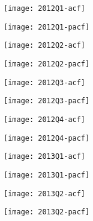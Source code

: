 \begin{figure}[htp]
	\centering
	\begin{subfigure}{0.23\textwidth}
		\centering
		\texttt{[image: 2012Q1-acf]}
	\end{subfigure}
	\begin{subfigure}{0.23\textwidth}
		\centering
		\texttt{[image: 2012Q1-pacf]}
	\end{subfigure}
	\begin{subfigure}{0.23\textwidth}
		\centering
		\texttt{[image: 2012Q2-acf]}
	\end{subfigure}
	\begin{subfigure}{0.23\textwidth}
		\centering
		\texttt{[image: 2012Q2-pacf]}
	\end{subfigure}
\end{figure}

\begin{figure}[htp]
	\centering
	\begin{subfigure}{0.23\textwidth}
		\centering
		\texttt{[image: 2012Q3-acf]}
	\end{subfigure}
	\begin{subfigure}{0.23\textwidth}
		\centering
		\texttt{[image: 2012Q3-pacf]}
	\end{subfigure}
	\begin{subfigure}{0.23\textwidth}
		\centering
		\texttt{[image: 2012Q4-acf]}
	\end{subfigure}
	\begin{subfigure}{0.23\textwidth}
		\centering
		\texttt{[image: 2012Q4-pacf]}
	\end{subfigure}
\end{figure}



\begin{figure}[htp]
	\centering
	\begin{subfigure}{0.23\textwidth}
		\centering
		\texttt{[image: 2013Q1-acf]}
	\end{subfigure}
	\begin{subfigure}{0.23\textwidth}
		\centering
		\texttt{[image: 2013Q1-pacf]}
	\end{subfigure}
	\begin{subfigure}{0.23\textwidth}
		\centering
		\texttt{[image: 2013Q2-acf]}
	\end{subfigure}
	\begin{subfigure}{0.23\textwidth}
		\centering
		\texttt{[image: 2013Q2-pacf]}
	\end{subfigure}
\end{figure}

